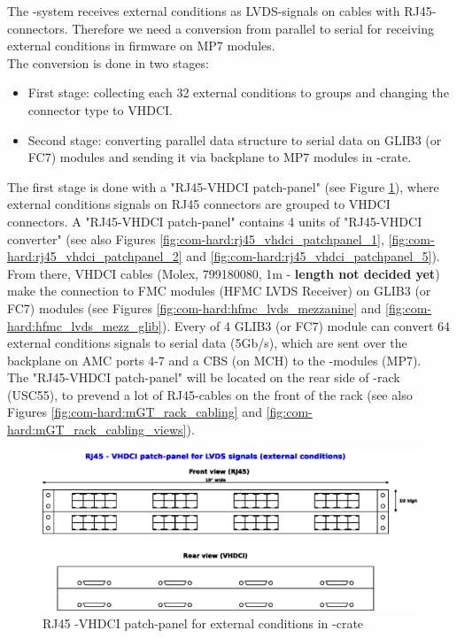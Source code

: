 The \ugt-system receives external conditions as LVDS-signals on cables with RJ45-connectors. Therefore we need a conversion from parallel
to serial for receiving external conditions in \ugt firmware on MP7 modules.\\
The conversion is done in two stages:
\begin{itemize}
\item First stage: collecting each 32 external conditions to groups and changing the connector type to VHDCI.
\item Second stage: converting parallel data structure to serial data on GLIB3 (or FC7) modules and sending it via backplane to MP7 modules in \ugt-crate.
\end{itemize}
The first stage is done with a "RJ45-VHDCI patch-panel" (see Figure \ref{fig:com-hard:mGT_rj45_vhdci_patch_panel}),
where external conditions signals on RJ45 connectors are grouped to VHDCI connectors. A "RJ45-VHDCI patch-panel" contains 4 units of "RJ45-VHDCI converter"
(see also Figures \ref{fig:com-hard:rj45_vhdci_patchpanel_1}, \ref{fig:com-hard:rj45_vhdci_patchpanel_2} and \ref{fig:com-hard:rj45_vhdci_patchpanel_5}).
From there, VHDCI cables (Molex, 799180080, 1m - \textbf{length not decided yet}) make the connection to FMC modules (HFMC LVDS Receiver) on GLIB3 (or FC7) modules
(see Figures \ref{fig:com-hard:hfmc_lvds_mezzanine} and \ref{fig:com-hard:hfmc_lvds_mezz_glib}).
Every of 4 GLIB3 (or FC7) module can convert 64 external conditions signals to serial data (5Gb/s), which are sent over the backplane on AMC ports 4-7 and a CBS (on MCH)
to the \ugt-modules (MP7).\\
The "RJ45-VHDCI patch-panel" will be located on the rear side of \ugt-rack (USC55), to prevend a lot of RJ45-cables on the front of the rack (see also Figures
\ref{fig:com-hard:mGT_rack_cabling} and \ref{fig:com-hard:mGT_rack_cabling_views}).

\begin{figure}[htb]
\centering
\includegraphics[width=14cm]{figures/mGT_rj45_vhdci_patch_panel}
\caption{RJ45 -VHDCI patch-panel for external conditions in \ugt-crate} 
\label{fig:com-hard:mGT_rj45_vhdci_patch_panel}
\end{figure}


